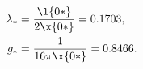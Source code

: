 \begin{equation}
  \label{eq:FP.values.old.notation}
    \begin{aligned}
      \lambda_*&=\frac{\l{0*}}{2\x{0*}}= 0.1703,\\
      g_*&= \frac{1}{16 \pi\x{0*}}= 0.8466.
    \end{aligned}
\end{equation}

